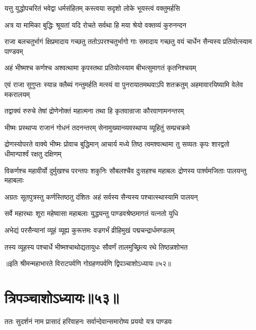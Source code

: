 \twolineshloka
{यत्तु युद्धोपचरितं भवेद्वा धर्मसंहितम्}
{कस्त्वया सदृशो लोके भूयस्त्वं वक्तुमर्हसि}


\twolineshloka
{अत्र या मामिका बुद्धिः श्रूयतां यदि रोचते}
{सर्वथा हि मया श्रेयो वक्तव्यं कुरुनन्दन}


\threelineshloka
{राजा बलचतुर्भागं क्षिप्रमादाय गच्छतु}
{ततोऽपरश्चतुर्भागो गाः समादाय गच्छतु}
{वयं चार्धेन सैन्यस्य प्रतियोत्स्याम पाण्डवम्}


\twolineshloka
{अहं भीष्मश्च कर्णश्च अश्वत्थामा कृपस्तथा}
{प्रतियोत्स्याम बीभत्सुमागतं कृतनिश्चयम्}


\threelineshloka
{एवं राजा सुगुप्तः स्यान्न क्लैब्यं गन्तुमर्हति}
{मत्स्यं वा पुनरायातमथवाऽपि शतक्रतुम्}
{अहमावारयिष्यामि वेलेव मकरालयम्}



\twolineshloka
{तद्वाक्यं रुरुचे तेषां द्रोणेनोक्तं महात्मना}
{तथा हि कृतवान्राजा कौरवाणामनन्तरम्}


\twolineshloka
{भीष्मः प्रस्थाप्य राजानं गोधनं तदनन्तरम्}
{सेनामुख्यान्व्यवस्थाप्य व्यूहितुं सम्प्रचक्रमे}


\threelineshloka
{द्रोणस्योपरते वाक्ये भीष्मः प्रोवाच बुद्धिमान्}
{आचार्य मध्ये तिष्ठ त्वमश्वत्थामा तु सव्यतः}
{कृपः शारद्वतो धीमान्पार्श्वं रक्षतु दक्षिणम्}


\threelineshloka
{विकर्णश्च महावीर्यो दुर्मुखश्च परन्तपः}
{शकुनिः सौबलश्चैव दुःसहश्च महाबलः}
{द्रोणस्य पार्श्वमजिताः पालयन्तु महाबलाः}


\twolineshloka
{अग्रतः सूतपुत्रस्तु कर्णस्तिष्ठतु दंशितः}
{अहं सर्वस्य सैन्यस्य पश्चात्स्थास्यामि पालयन्}


\twolineshloka
{सर्वे महारथाः शूरा महेष्वासा महाबलाः}
{युद्ध्यन्तु पाण्डवश्रेष्ठमागतं यत्नतो युधि}



\twolineshloka
{अभेद्यं परसैन्यानां व्यूहं व्यूह्य कुरूत्तमः}
{वज्रगर्भं व्रीहिमुखं पद्मचन्द्रार्धमण्डलम्}


\twolineshloka
{तस्य व्यूहस्य पश्चार्धे भीष्मश्चाथोद्यतायुधः}
{सौवर्णं तालमुच्छ्रित्य रथे तिष्ठन्नशोभत}

॥इति श्रीमन्महाभारते विराटपर्वणि गोग्रहणपर्वणि द्विपञ्चाशोऽध्यायः॥५२॥

\chapter{त्रिपञ्चाशोऽध्यायः॥५३॥}

\twolineshloka
{ततः सुदर्शनं नाम प्रासादं हरिवाहनः}
{सर्वान्देवान्समारोष्य प्रययो यत्र पाण्डवः}


